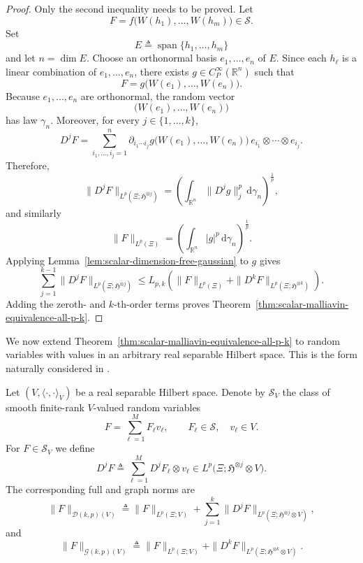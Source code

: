 \documentclass[12pt]{article}
\theoremstyle{plain}
\theoremstyle{definition}
\theoremstyle{remark}
\numberwithin{equation}{section}
\begin{document}
\begin{proof}
	Only the second inequality needs to be proved.  Let
	$$
	F=f\bigl(W(h_{1}),\ldots,W(h_{m})\bigr)\in\mathcal{S}.
	$$
	Set
	$$
	E\triangleq\operatorname{span}\{h_{1},\ldots,h_{m}\}
	$$
	and let $n=\dim E$.  Choose an orthonormal basis $e_{1},\ldots,e_{n}$ of $E$.  Since each $h_{\ell}$ is a linear combination of $e_{1},\ldots,e_{n}$, there exists $g\in C_{P}^{\infty}(\mathbb{R}^{n})$ such that
	$$
	F=g\bigl(W(e_{1}),\ldots,W(e_{n})\bigr).
	$$
	Because $e_{1},\ldots,e_{n}$ are orthonormal, the random vector
	$$
	\bigl(W(e_{1}),\ldots,W(e_{n})\bigr)
	$$
	has law $\gamma_{n}$.  Moreover, for every $j\in\{1,\ldots,k\}$,
	$$
	D^{j}F
	=
	\sum_{i_{1},\ldots,i_{j}=1}^{n}
	\partial_{i_{1}\cdots i_{j}}g\bigl(W(e_{1}),\ldots,W(e_{n})\bigr)
	\,e_{i_{1}}\otimes\cdots\otimes e_{i_{j}}.
	$$
	Therefore,
	$$
	\|D^{j}F\|_{L^{p}(\Xi;\mathfrak{H}^{\otimes j})}
	=
	\left(
	\int_{\mathbb{R}^{n}}\|D^{j}g\|_{j}^{p}\,\mathrm{d}\gamma_{n}
	\right)^{\frac1p},
	$$
	and similarly
	$$
	\|F\|_{L^{p}(\Xi)}
	=
	\left(
	\int_{\mathbb{R}^{n}}|g|^{p}\,\mathrm{d}\gamma_{n}
	\right)^{\frac1p}.
	$$
	Applying Lemma~\ref{lem:scalar-dimension-free-gaussian} to $g$ gives
	$$
	\sum_{j=1}^{k-1}
	\|D^{j}F\|_{L^{p}(\Xi;\mathfrak{H}^{\otimes j})}
	\leqslant
	L_{p,k}
	\left(
	\|F\|_{L^{p}(\Xi)}
	+
	\|D^{k}F\|_{L^{p}(\Xi;\mathfrak{H}^{\otimes k})}
	\right).
	$$
	Adding the zeroth- and $k$-th-order terms proves Theorem~\ref{thm:scalar-malliavin-equivalence-all-p-k}.
\end{proof}




We now extend Theorem~\ref{thm:scalar-malliavin-equivalence-all-p-k} to random variables with values in an arbitrary real separable Hilbert space.  This is the form naturally considered in \cite{AddonaMuratoriRossi}.

Let $(V,\langle\cdot,\cdot\rangle_{V})$ be a real separable Hilbert space.  Denote by $\mathcal{S}_{V}$ the class of smooth finite-rank $V$-valued random variables
$$
F=\sum_{\ell=1}^{M}F_{\ell}v_{\ell},
\qquad
F_{\ell}\in\mathcal{S},\quad v_{\ell}\in V.
$$
For $F\in\mathcal{S}_{V}$ we define
$$
D^{j}F
\triangleq
\sum_{\ell=1}^{M}D^{j}F_{\ell}\otimes v_{\ell}
\in
L^{p}\bigl(\Xi;\mathfrak{H}^{\otimes j}\otimes V\bigr).
$$
The corresponding full and graph norms are
$$
\|F\|_{\mathcal{D}(k,p)(V)}
\triangleq
\|F\|_{L^{p}(\Xi;V)}
+
\sum_{j=1}^{k}
\|D^{j}F\|_{L^{p}(\Xi;\mathfrak{H}^{\otimes j}\otimes V)},
$$
and
$$
\|F\|_{\mathcal{G}(k,p)(V)}
\triangleq
\|F\|_{L^{p}(\Xi;V)}
+
\|D^{k}F\|_{L^{p}(\Xi;\mathfrak{H}^{\otimes k}\otimes V)}.
$$
\end{document}
